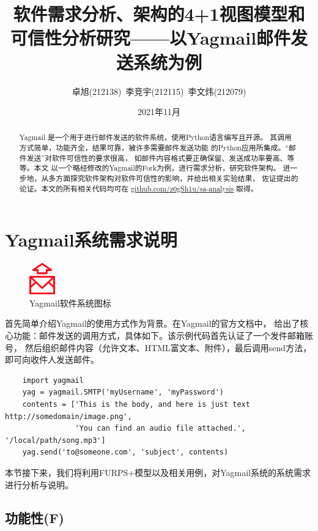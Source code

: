 \documentclass[UTF8,12pt,a4paper]{ctexart}
\title{软件需求分析、架构的4+1视图模型和可信性分析研究——以Yagmail邮件发送系统为例}
\author{卓旭(212138)~李竞宇(212115)~李文炜(212079)}
\date{2021年11月}
\begin{document}
\maketitle

    \begin{abstract}
        Yagmail \cite{yagmail} 是一个用于进行邮件发送的软件系统，使用Python语言编写且开源。
        其调用方式简单，功能齐全，结果可靠，被许多需要邮件发送功能
        的Python应用所集成。“邮件发送”对软件可信性的要求很高，
        如邮件内容格式要正确保留、发送成功率要高、等等。本文
        以一个略经修改的Yagmail的Fork为例，进行需求分析，研究软件架构。
        进一步地，从多方面探究软件架构对软件可信性的影响，并给出相关实验结果，
        佐证提出的论证。本文的所有相关代码均可在 \url{github.com/z0gSh1u/sa-analysis}
        取得。
    \end{abstract}

\newpage
\tableofcontents

\newpage
\section{Yagmail系统需求说明}
    \begin{figure}[H]
        \centering
        \includegraphics[width=0.1\textwidth]{figure/yagmail-icon.png}
        \caption{Yagmail软件系统图标}
    \end{figure}

    首先简单介绍Yagmail的使用方式作为背景。在Yagmail的官方文档中，
    给出了核心功能：邮件发送的调用方式，具体如下。该示例代码首先认证了一个发件邮箱账号，
    然后组织邮件内容（允许文本、HTML富文本、附件），最后调用send方法，即可向收件人发送邮件。
    
    \begin{lstlisting}
    import yagmail
    yag = yagmail.SMTP('myUsername', 'myPassword')
    contents = ['This is the body, and here is just text http://somedomain/image.png',
                'You can find an audio file attached.', '/local/path/song.mp3']
    yag.send('to@someone.com', 'subject', contents)
    \end{lstlisting}

    本节接下来，我们将利用FURPS+模型\cite{furps}以及相关用例，对Yagmail系统的系统需求进行分析与说明。

\subsection{功能性(F)}
\end{document}
